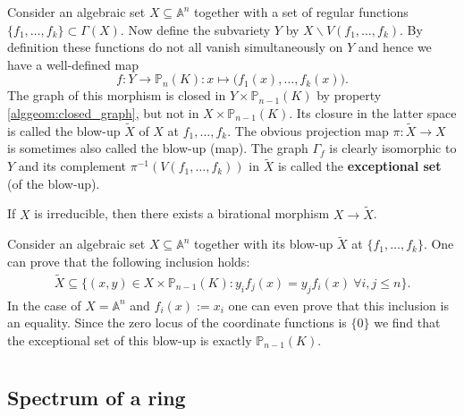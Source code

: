 {{    \begin{construct}[Blow-up]
        Consider an algebraic set $X\subseteq\mathbb{A}^n$ together with a set of regular functions $\{f_1,\ldots,f_k\}\subset\Gamma(X)$. Now define the subvariety $Y$ by $X\backslash V(f_1,\ldots,f_k)$. By definition these functions do not all vanish simultaneously on $Y$ and hence we have a well-defined map \[f:Y\rightarrow \mathbb{P}_n(K):x\mapsto\Big(f_1(x),\ldots,f_k(x)\Big).\] The graph of this morphism is closed in $Y\times\mathbb{P}_{n-1}(K)$ by property \ref{alggeom:closed_graph}, but not in $X\times\mathbb{P}_{n-1}(K)$. Its closure in the latter space is called the blow-up $\widetilde{X}$ of $X$ at $f_1,\ldots,f_k$. The obvious projection map $\pi:\widetilde{X}\rightarrow X$ is sometimes also called the blow-up (map). The graph $\Gamma_f$ is clearly isomorphic to $Y$ and its complement $\pi^{-1}(V(f_1,\ldots,f_k))$ in $\widetilde{X}$ is called the \textbf{exceptional set} (of the blow-up).

        If $X$ is irreducible, then there exists a birational morphism $X\rightarrow\widetilde{X}$.
    \end{construct}

    \begin{property}
        Consider an algebraic set $X\subseteq\mathbb{A}^n$ together with its blow-up $\widetilde{X}$ at $\{f_1,\ldots,f_k\}$. One can prove that the following inclusion holds:
        \begin{gather}
            \widetilde{X}\subseteq\{(x,y)\in X\times\mathbb{P}_{n-1}(K):y_if_j(x)=y_jf_i(x)\ \forall i,j\leq n\}.
        \end{gather}
        In the case of $X=\mathbb{A}^n$ and $f_i(x):=x_i$ one can even prove that this inclusion is an equality. Since the zero locus of the coordinate functions is $\{0\}$ we find that the exceptional set of this blow-up is exactly $\mathbb{P}_{n-1}(K)$.
    \end{property}

\section{}
\subsection{Spectrum of a ring}


}}
